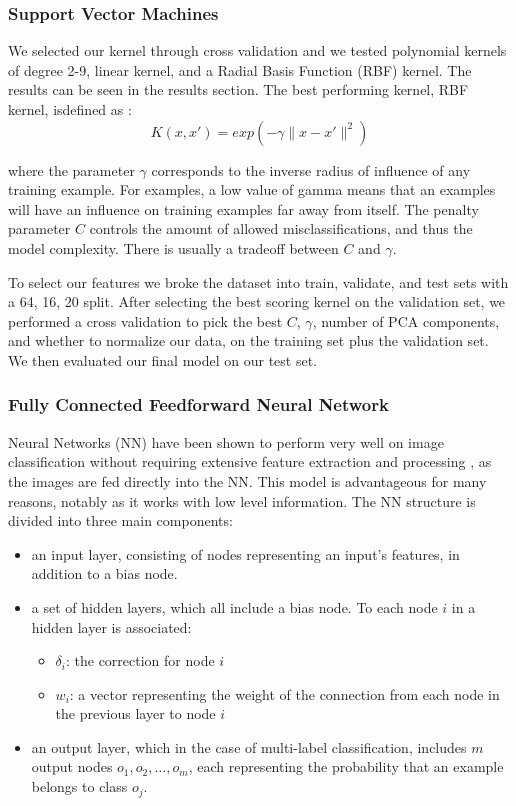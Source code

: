 \documentclass[conference]{IEEEtran}
\begin{document}
\subsubsection{Support Vector Machines}
We selected our kernel through cross validation and we tested polynomial kernels of degree 2-9, linear kernel, and a Radial Basis Function (RBF) kernel. The results can be seen in the results section. The best performing kernel, RBF kernel, isdefined as \cite{Hastie}: \[K(x,x\prime )=exp(-\gamma\|x-x\prime \|^2)\] 

where the parameter $\gamma$ corresponds to the inverse radius of influence of any training example. For examples, a low value of gamma means that an examples will have an influence on training examples far away from itself\cite{sklearn}. The penalty parameter $C$ controls the amount of allowed misclassifications, and thus the model complexity. There is usually a tradeoff between $C$ and $\gamma$. 

To select our features we broke the dataset into train, validate, and test sets with a 64, 16, 20 split. After selecting the best scoring kernel on the validation set, we performed a cross validation to pick the best $C$, $\gamma$, number of PCA components, and whether to normalize our data, on the training set plus the validation set. We then evaluated our final model on our test set.


\subsubsection{Fully Connected Feedforward Neural Network}

Neural Networks (NN) have been shown to perform very well on image classification without requiring extensive feature extraction and processing \cite{LeCun90}, as the images are fed directly into the NN. This model is advantageous for many reasons, notably as it works with low level information. The NN structure is divided into three main components: 
\begin{itemize}
\item an input layer, consisting of nodes representing an input's features, in addition to a bias node.
\item a set of hidden layers, which all include a bias node. To each node $i$ in a hidden layer is associated:
\begin{itemize}
\item $\delta_i$: the correction for node $i$
\item $w_i$: a vector representing the weight of the connection from each node in the previous layer to node $i$
\end{itemize}
\item an output layer, which in the case of multi-label classification, includes $m$ output nodes $o_1,o_2,\dots,o_m$, each representing the probability that an example belongs to class $o_j$.
\end{itemize}
\end{document}
